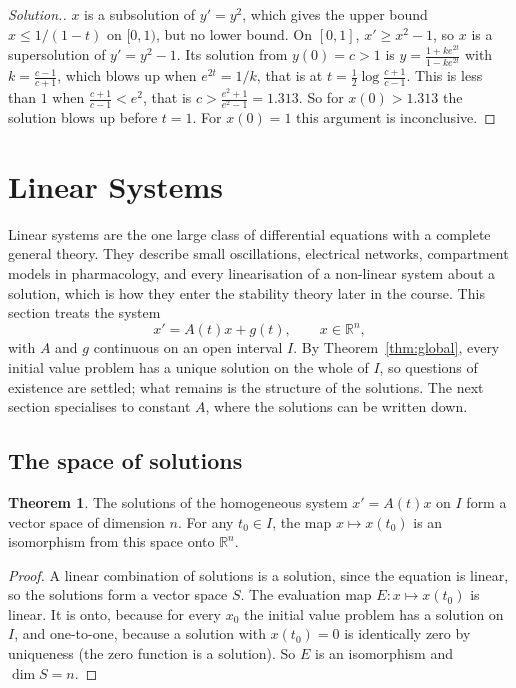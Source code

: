 \documentclass[11pt,a4paper]{article}
\numberwithin{equation}{section}
\theoremstyle{definition}
\newtheorem{thm}{Theorem}[subsection]
\newenvironment{solution}
  {\renewcommand{\qedsymbol}{}\begin{proof}[\textit{Solution}.]}
  {\end{proof}}
\begin{document}
\begin{solution}
$x$ is a subsolution of $y' = y^2$, which gives the upper bound $x \leq 1/(1 - t)$ on $[0, 1)$, but no lower bound. On $[0, 1]$, $x' \geq x^2 - 1$, so $x$ is a supersolution of $y' = y^2 - 1$. Its
solution from $y(0) = c > 1$ is $y = \frac{1 + ke^{2t}}{1 - ke^{2t}}$ with $k = \frac{c - 1}{c + 1}$, which blows up when $e^{2t} = 1/k$, that is at $t = \frac12\log\frac{c + 1}{c - 1}$. This is less than $1$ when $\frac{c + 1}{c - 1} < e^2$, that
is $c > \frac{e^2 + 1}{e^2 - 1} = 1.313$. So for $x(0) > 1.313$ the solution blows up before $t = 1$. For $x(0) = 1$ this argument is inconclusive.
\end{solution}

\section{Linear Systems}
\label{sec:linear}

Linear systems are the one large class of differential equations with a complete general theory. They describe small oscillations, electrical
networks, compartment models in pharmacology, and every linearisation of a non-linear system about a solution, which is how they enter the
stability theory later in the course. This section treats the system
\[
x' = A(t)x + g(t), \qquad x \in \mathbb R^n,
\]
with $A$ and $g$ continuous on an open interval $I$. By Theorem~\ref{thm:global}, every initial value problem has a unique solution on the whole of $I$, so questions of existence
are settled; what remains is the structure of the solutions. The next section specialises to constant $A$, where the solutions can be written down.

\subsection{The space of solutions}
\label{ssec:solspace}

\begin{thm}
\label{thm:solspace}
The solutions of the homogeneous system $x' = A(t)x$ on $I$ form a vector space of dimension $n$. For any $t_0 \in I$, the map $x \mapsto x(t_0)$ is an isomorphism from this space onto $\mathbb R^n$.
\end{thm}

\begin{proof}
A linear combination of solutions is a solution, since the equation is linear, so the solutions form a vector space $S$. The evaluation map $E\colon x \mapsto x(t_0)$ is linear. It is
onto, because for every $x_0$ the initial value problem has a solution on $I$, and one-to-one, because a solution with $x(t_0) = 0$ is identically zero by uniqueness (the zero
function is a solution). So $E$ is an isomorphism and $\dim S = n$.
\end{proof}
\end{document}
